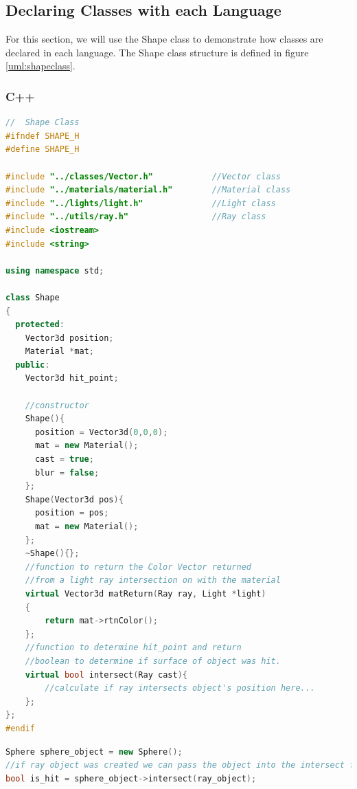 \subsection{Declaring Classes with each Language}
For this section, we will use the Shape class to demonstrate how classes are declared in each language.  The Shape class structure is defined in figure \ref{uml:shapeclass}.
\subsubsection{C++}
\singlespacing
\begin{lstlisting}[language=C++, caption=C++ Class Example, style=mystyle, label=list:c++Class]
//  Shape Class
#ifndef SHAPE_H
#define SHAPE_H

#include "../classes/Vector.h"            //Vector class
#include "../materials/material.h"        //Material class
#include "../lights/light.h"              //Light class
#include "../utils/ray.h"                 //Ray class
#include <iostream>
#include <string>

using namespace std;

class Shape
{
  protected:
    Vector3d position;
    Material *mat;
  public:
    Vector3d hit_point;

    //constructor
    Shape(){
      position = Vector3d(0,0,0);
      mat = new Material();
      cast = true;
      blur = false;
    };
    Shape(Vector3d pos){
      position = pos;
      mat = new Material();
    };
    ~Shape(){};
    //function to return the Color Vector returned
    //from a light ray intersection on with the material
    virtual Vector3d matReturn(Ray ray, Light *light)
    {
        return mat->rtnColor();
    };
    //function to determine hit_point and return
    //boolean to determine if surface of object was hit.
    virtual bool intersect(Ray cast){
        //calculate if ray intersects object's position here...
    };
};
#endif
\end{lstlisting}
\begin{lstlisting}[language=C++, caption=C++ Class Usage Example, style=mystyle, label=list:c++Use]
Sphere sphere_object = new Sphere();
//if ray object was created we can pass the object into the intersect function.
bool is_hit = sphere_object->intersect(ray_object);
\end{lstlisting}
\doublespacing
